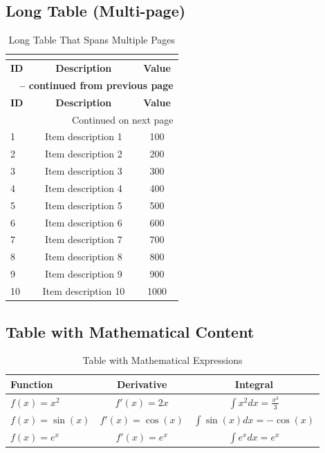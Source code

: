 \documentclass[a4paper,12pt]{article}
\begin{document}
\subsection{Long Table (Multi-page)}
\begin{longtable}{lcc}
\caption{Long Table That Spans Multiple Pages} \\
\label{tab:long} \\
\toprule
\textbf{ID} & \textbf{Description} & \textbf{Value} \\
\midrule
\endfirsthead

\multicolumn{3}{c}{{\bfseries \tablename\ \thetable{} -- continued from previous page}} \\
\toprule
\textbf{ID} & \textbf{Description} & \textbf{Value} \\
\midrule
\endhead

\midrule
\multicolumn{3}{r}{{Continued on next page}} \\
\endfoot

\bottomrule
\endlastfoot

1 & Item description 1 & 100 \\
2 & Item description 2 & 200 \\
3 & Item description 3 & 300 \\
4 & Item description 4 & 400 \\
5 & Item description 5 & 500 \\
6 & Item description 6 & 600 \\
7 & Item description 7 & 700 \\
8 & Item description 8 & 800 \\
9 & Item description 9 & 900 \\
10 & Item description 10 & 1000 \\
\end{longtable}

\subsection{Table with Mathematical Content}
\begin{table}[H]
\centering
\caption{Table with Mathematical Expressions}
\label{tab:math}
\begin{tabular}{lcc}
\toprule
\textbf{Function} & \textbf{Derivative} & \textbf{Integral} \\
\midrule
$f(x) = x^2$ & $f'(x) = 2x$ & $\int x^2 dx = \frac{x^3}{3}$ \\
$f(x) = \sin(x)$ & $f'(x) = \cos(x)$ & $\int \sin(x) dx = -\cos(x)$ \\
$f(x) = e^x$ & $f'(x) = e^x$ & $\int e^x dx = e^x$ \\
\bottomrule
\end{tabular}
\end{table}
\end{document}
